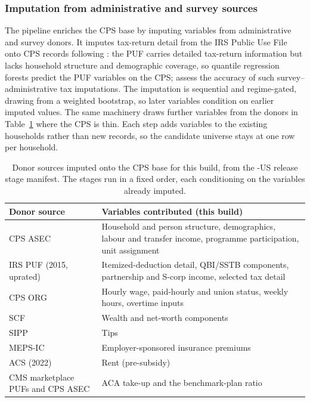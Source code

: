 \subsubsection{Imputation from administrative and survey sources}

The pipeline enriches the CPS base by imputing variables from administrative and survey donors. It
imputes tax-return detail from the IRS Public Use File \citep[PUF;][]{bryant2023a} onto CPS records
following \citet{woodruff2024}: the PUF carries detailed tax-return information but lacks household
structure and demographic coverage, so quantile regression forests \citep{meinshausen2006quantile}
predict the PUF variables on the CPS; \citet{meyer2021} assess the accuracy of such
survey--administrative tax imputations. The imputation is sequential and regime-gated, drawing from a
weighted bootstrap, so later variables condition on earlier imputed values. The same machinery draws
further variables from the donors in Table~\ref{tab:donors} where the CPS is thin. Each step adds
variables to the existing households rather than new records, so the candidate universe stays at one
row per household.

\begin{table}[H]
\centering
{\tablefont
\begin{tabular}{@{}p{}p{}@{}}
\toprule
Donor source & Variables contributed (this build) \\
\midrule
CPS ASEC & Household and person structure, demographics, labour and transfer income, programme participation, unit assignment \\
IRS PUF (2015, uprated) & Itemized-deduction detail, QBI/SSTB components, partnership and S-corp income, selected tax detail \\
CPS ORG & Hourly wage, paid-hourly and union status, weekly hours, overtime inputs \\
SCF & Wealth and net-worth components \\
SIPP & Tips \\
MEPS-IC & Employer-sponsored insurance premiums \\
ACS (2022) & Rent (pre-subsidy) \\
CMS marketplace PUFs and CPS ASEC & ACA take-up and the benchmark-plan ratio \\
\bottomrule
\end{tabular}
}
\caption{Donor sources imputed onto the CPS base for this build, from the \populace{}-US release stage
manifest. The stages run in a fixed order, each conditioning on the variables already imputed.}
\label{tab:donors}
\end{table}

